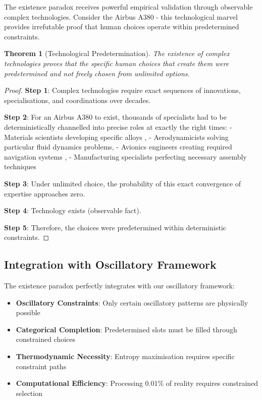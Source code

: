 \documentclass[11pt]{article}
\newtheorem{theorem}{Theorem}[section]
\theoremstyle{remark}
\begin{document}
The existence paradox receives powerful empirical validation through observable complex technologies. Consider the Airbus A380 - this technological marvel provides irrefutable proof that human choices operate within predetermined constraints.

\begin{theorem}[Technological Predetermination]
The existence of complex technologies proves that the specific human choices that create them were predetermined and not freely chosen from unlimited options.
\end{theorem}

\begin{proof}
\textbf{Step 1}: Complex technologies require exact sequences of innovations, specialisations, and coordinations over decades.

\textbf{Step 2}: For an Airbus A380 to exist, thousands of specialists had to be deterministically channelled into precise roles at exactly the right times:
- Materials scientists developing specific alloys
, - Aerodynamicists solving particular fluid dynamics problems, 
- Avionics engineers creating required navigation systems
, - Manufacturing specialists perfecting necessary assembly techniques

\textbf{Step 3}: Under unlimited choice, the probability of this exact convergence of expertise approaches zero.

\textbf{Step 4}: Technology exists (observable fact).

\textbf{Step 5}: Therefore, the choices were predetermined within deterministic constraints.
\end{proof}

\subsection{Integration with Oscillatory Framework}

The existence paradox perfectly integrates with our oscillatory framework:

\begin{itemize}
\item \textbf{Oscillatory Constraints}: Only certain oscillatory patterns are physically possible
\item \textbf{Categorical Completion}: Predetermined slots must be filled through constrained choices
\item \textbf{Thermodynamic Necessity}: Entropy maximisation requires specific constraint paths
\item \textbf{Computational Efficiency}: Processing 0.01\% of reality requires constrained selection
\end{itemize}
\end{document}
